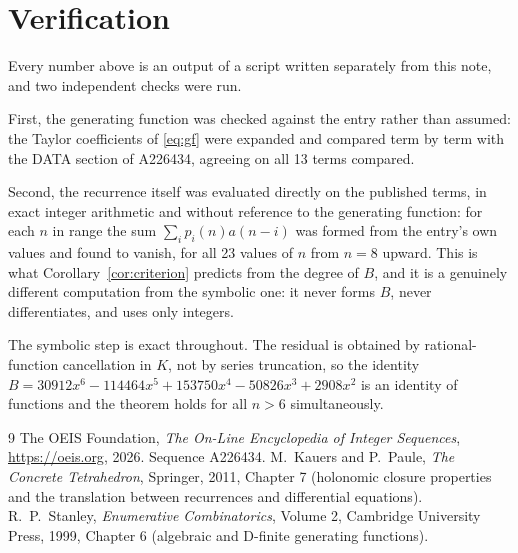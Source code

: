 \documentclass[11pt,a4paper]{article}
\theoremstyle{plain}
\theoremstyle{definition}
\begin{document}
\section{Verification}

Every number above is an output of a script written separately from this note, and two
independent checks were run.

First, the generating function was checked against the entry rather than assumed: the
Taylor coefficients of \eqref{eq:gf} were expanded and compared term by term with the DATA
section of A226434, agreeing on all 13 terms compared.

Second, the recurrence itself was evaluated directly on the published terms, in exact
integer arithmetic and without reference to the generating function: for each $n$ in range
the sum $\sum_{i}p_{i}(n)a(n-i)$ was formed from the entry's own values and found to
vanish, for all 23 values of $n$ from $n=8$ upward. This is what
Corollary~\ref{cor:criterion} predicts from the degree of $B$, and it is a genuinely
different computation from the symbolic one: it never forms $B$, never differentiates, and
uses only integers.

The symbolic step is exact throughout. The residual is obtained by rational-function
cancellation in $K$, not by series truncation, so the identity $B=30912 x^{6} - 114464 x^{5} + 153750 x^{4} - 50826 x^{3} + 2908 x^{2}$ is an
identity of functions and the theorem holds for all $n>6$ simultaneously.

\begin{thebibliography}{9}
 The OEIS Foundation, \emph{The On-Line Encyclopedia of Integer Sequences},
\url{https://oeis.org}, 2026. Sequence A226434.
 M.~Kauers and P.~Paule, \emph{The Concrete Tetrahedron}, Springer, 2011,
Chapter 7 (holonomic closure properties and the translation between recurrences and
differential equations).
 R.~P.~Stanley, \emph{Enumerative Combinatorics}, Volume 2, Cambridge
University Press, 1999, Chapter 6 (algebraic and D-finite generating functions).
\end{thebibliography}
\end{document}

